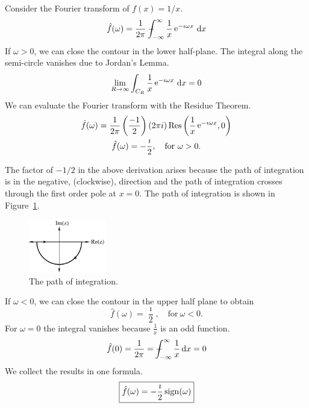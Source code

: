 \begin{Example}
  \label{ex_int_sin}
  Consider the Fourier transform of $f(x) = 1/x$.
  \[ 
  \hat{f}(\omega) = \frac{1}{2\pi} - \negthickspace \negthickspace \negthickspace \negmedspace \int_{-\infty}^\infty \frac{1}{x} \mathop{\mathrm{e}}\nolimits^{-\imath \omega x}\,\mathrm{d} x
  \]
  If $\omega > 0$, we can close the contour in the lower half-plane.
  The integral along the semi-circle vanishes due to Jordan's Lemma.
  \[ 
  \lim_{R \to \infty} \int_{C_R} \frac{1}{x} \mathop{\mathrm{e}}\nolimits^{-\imath \omega x}\,\mathrm{d} x = 0
  \]
  We can evaluate the Fourier transform with the Residue Theorem.
  \begin{gather*}
    \hat{f}(\omega) = \frac{1}{2\pi} \left(\frac{-1}{2}\right) (2 \pi i) \mathop{\mathrm{Res}}\nolimits
    \left( \frac{1}{x} \mathop{\mathrm{e}}\nolimits^{-\imath \omega x}, 0 \right) 
    \\
    \hat{f}(\omega) = -\frac{\imath}{2}, \quad \mathrm{for}\ \omega > 0.
  \end{gather*}

  The factor of $-1/2$ in the above derivation arises because the path of
  integration is in the negative, (clockwise), direction and the path
  of integration crosses through the first order pole at $x = 0$.
  The path of integration is shown in Figure~\ref{fig_one_half}.


  \begin{figure}[h!]
    \begin{center}
      \includegraphics[width=0.3\textwidth]{ode/fourier_transform/fig_one_half}
    \end{center}
    \caption{The path of integration.}
    \label{fig_one_half}
  \end{figure}



  If $\omega < 0$, we can close the contour in the upper half plane to 
  obtain
  \[
  \hat{f}(\omega) = \frac{\imath}{2}, \quad \mathrm{for}\ \omega < 0.
  \]
  For $\omega = 0$ the integral vanishes because
  $\frac{1}{x}$ is an odd function.
  \[
  \hat{f}(0) = \frac{1}{2\pi} = - \negthickspace \negthickspace \negthickspace \negmedspace \int_{-\infty}^\infty \frac{1}{x} \,\mathrm{d} x = 0
  \]
  We collect the results in one formula.
  \[
  \boxed{
    \hat{f}(\omega) = - \frac{\imath}{2} \mathop{\mathrm{sign}}\nolimits(\omega)
    }
  \]








\end{Example}
